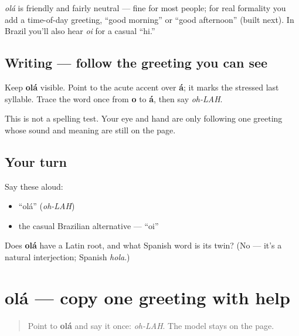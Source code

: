\begin{culture}
\emph{olá} is friendly and fairly neutral — fine for most people; for real formality you add a time-of-day greeting, \textquotedblleft{}good morning\textquotedblright{} or \textquotedblleft{}good afternoon\textquotedblright{} (built next). In Brazil you'll also hear \emph{oi} for a casual \textquotedblleft{}hi.\textquotedblright{}
\end{culture}

\subsection*{Writing — follow the greeting you can see}
Keep \textbf{olá} visible. Point to the acute accent over \textbf{á}; it marks the stressed last syllable. Trace the word once from \textbf{o} to \textbf{á}, then say \emph{oh-LAH}.

This is not a spelling test. Your eye and hand are only following one greeting whose sound and meaning are still on the page.

\subsection*{Your turn}
Say these aloud:

\begin{itemize}
\raggedright
  \item \textquotedblleft{}olá\textquotedblright{} (\emph{oh-LAH})
  \item the casual Brazilian alternative — \textquotedblleft{}oi\textquotedblright{}
\end{itemize}

\begin{tcolorbox}[breakable,colback=teal!4,colframe=teal!35!black,title={Before you move on}]
Does \textbf{olá} have a Latin root, and what Spanish word is its twin? (No — it's a natural interjection; Spanish \emph{hola}.)
\end{tcolorbox}
\section[olá]{olá — copy one greeting with help}

\label{lesson:PT-W01-ola-guided-copy}



\begin{quote}
Point to \textbf{olá} and say it once: \emph{oh-LAH}. The model stays on the page.
\end{quote}


